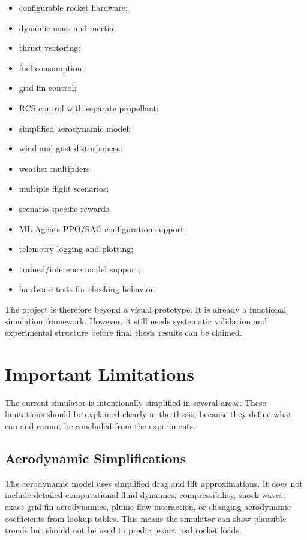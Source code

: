 \documentclass[12pt,a4paper]{article}
\begin{document}
\begin{itemize}
    \item configurable rocket hardware;
    \item dynamic mass and inertia;
    \item thrust vectoring;
    \item fuel consumption;
    \item grid fin control;
    \item RCS control with separate propellant;
    \item simplified aerodynamic model;
    \item wind and gust disturbances;
    \item weather multipliers;
    \item multiple flight scenarios;
    \item scenario-specific rewards;
    \item ML-Agents PPO/SAC configuration support;
    \item telemetry logging and plotting;
    \item trained/inference model support;
    \item hardware tests for checking behavior.
\end{itemize}

The project is therefore beyond a visual prototype. It is already a functional simulation framework. However, it still needs systematic validation and experimental structure before final thesis results can be claimed.

\section{Important Limitations}

The current simulator is intentionally simplified in several areas. These limitations should be explained clearly in the thesis, because they define what can and cannot be concluded from the experiments.

\subsection{Aerodynamic Simplifications}

The aerodynamic model uses simplified drag and lift approximations. It does not include detailed computational fluid dynamics, compressibility, shock waves, exact grid-fin aerodynamics, plume-flow interaction, or changing aerodynamic coefficients from lookup tables. This means the simulator can show plausible trends but should not be used to predict exact real rocket loads.
\end{document}
